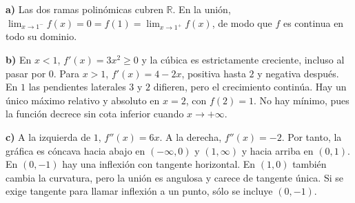 \textbf{a)} Las dos ramas polinómicas cubren $\mathbb R$. En la unión, $\lim_{x\to1^-}f(x)=0=f(1)=\lim_{x\to1^+}f(x)$, de modo que $f$ es continua en todo su dominio.

\textbf{b)} En $x<1$, $f'(x)=3x^2\ge0$ y la cúbica es estrictamente creciente, incluso al pasar por $0$. Para $x>1$, $f'(x)=4-2x$, positiva hasta $2$ y negativa después. En $1$ las pendientes laterales $3$ y $2$ difieren, pero el crecimiento continúa. Hay un único máximo relativo y absoluto en $x=2$, con $f(2)=\boxed{1}$. No hay mínimo, pues la función decrece sin cota inferior cuando $x\to+\infty$.

\textbf{c)} A la izquierda de $1$, $f''(x)=6x$. A la derecha, $f''(x)=-2$. Por tanto, la gráfica es cóncava hacia abajo en $(-\infty,0)$ y $(1,\infty)$ y hacia arriba en $(0,1)$. En $(0,-1)$ hay una inflexión con tangente horizontal. En $(1,0)$ también cambia la curvatura, pero la unión es angulosa y carece de tangente única. Si se exige tangente para llamar inflexión a un punto, sólo se incluye $(0,-1)$.
